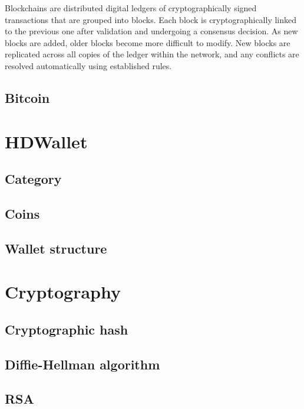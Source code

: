 Blockchains are distributed digital ledgers of cryptographically signed transactions that are grouped into blocks. Each block is cryptographically linked to the previous one after validation and undergoing a consensus decision. As new blocks are added, older blocks become more difficult to modify. New blocks are replicated across all copies of the ledger within the network, and any conflicts are resolved automatically using established rules. 



\subsection{Bitcoin}



\section{HDWallet}

\subsection{Category}

\subsection{Coins}

\subsection{Wallet structure}

\section{Cryptography}

\subsection{Cryptographic hash}

\subsection{Diffie-Hellman algorithm}

\subsection{RSA}

